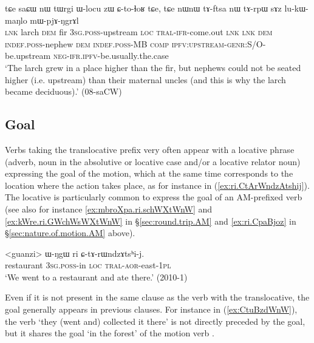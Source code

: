 \begin{exe}
\ex \label{ex:saCW.CtolhoR}
\gll  tɕe saɕɯ nɯ tɯrgi ɯ-locu zɯ ɕ-to-ɬoʁ tɕe, tɕe nɯnɯ tɤ-ftsa nɯ tɤ-rpɯ sɤz lu-kɯ-maŋlo mɯ-pjɤ-ŋgrɤl\\
\textsc{lnk} larch \textsc{dem} fir \textsc{3sg}.\textsc{poss}-upstream \textsc{loc} \textsc{tral}-\textsc{ifr}-come.out \textsc{lnk} \textsc{lnk}  \textsc{dem} \textsc{indef}.\textsc{poss}-nephew \textsc{dem} \textsc{indef}.\textsc{poss}-MB \textsc{comp} \textsc{ipfv}:\textsc{upstream}-\textsc{genr}:S/O-be.upstream \textsc{neg}-\textsc{ifr}.\textsc{ipfv}-be.usually.the.case\\
\glt `The larch grew in a place higher than the fir, but nephews could not be seated higher (i.e. upstream) than their maternal uncles (and this is why the larch became deciduous).' (08-saCW) 
\end{exe}
 
 
\subsection{Goal} \label{sec:AM.goal}
Verbs taking the translocative prefix very often appear with a locative phrase (adverb, noun in the absolutive or locative case and/or a locative relator noun) expressing the goal of the motion, which at the same time corresponds to the location where the action takes place, as for instance in (\ref{ex:ri.CtArWndzAtshij}). The locative  is particularly common to express the goal of an AM-prefixed verb (see also for instance  \ref{ex:mbroXpa.ri.schWXtWnW}  and \ref{ex:kWre.ri.GWchWsWXtWnW} in §\ref{sec:round.trip.AM} and \ref{ex:ri.CpaBjoz} in §\ref{sec:nature.of.motion.AM} above).

\begin{exe}
\ex \label{ex:ri.CtArWndzAtshij} 
\gll <guanzi> ɯ-ŋgɯ ri ɕ-tɤ-rɯndzɤtsʰi-j. \\
restaurant \textsc{3sg}.\textsc{poss}-in \textsc{loc} \textsc{tral}-\textsc{aor}-east-\textsc{1pl} \\
\glt `We went to a restaurant and ate there.' (2010-1)
\end{exe}

Even if it is not present in the same clause as the verb with the translocative, the goal generally appears in previous clauses. For instance in (\ref{ex:CtuBzdWnW}), the verb  `they (went and) collected it there' is not directly preceded by the goal, but it shares the goal  `in the forest' of the motion verb .

